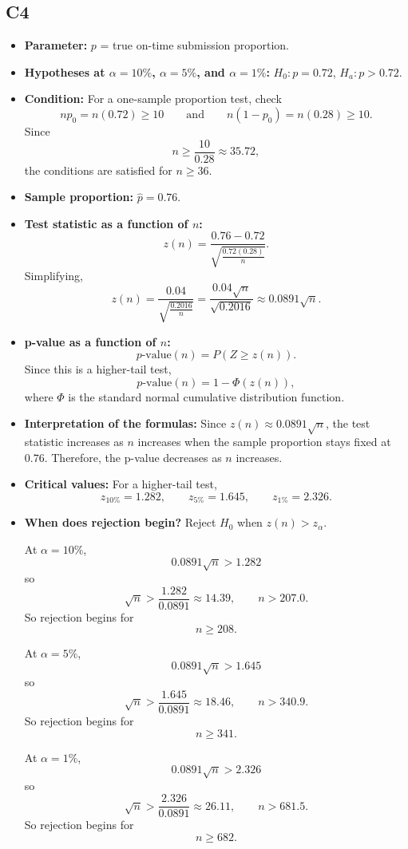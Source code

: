 \subsection*{C4}
\begin{itemize}
	\item \textbf{Parameter:} \(p\) = true on-time submission proportion.
	\item \textbf{Hypotheses at \(\alpha=10\%\), \(\alpha=5\%\), and \(\alpha=1\%\):} \(H_0\colon p=0.72\), \(H_a\colon p>0.72\).
	\item \textbf{Condition:} For a one-sample proportion test, check
	\[
	np_0=n(0.72)\ge10
	\qquad\text{and}\qquad
	n(1-p_0)=n(0.28)\ge10.
	\]
	Since
	\[
	n\ge \frac{10}{0.28}\approx 35.72,
	\]
	the conditions are satisfied for \(n\ge36\).
	\item \textbf{Sample proportion:} \(\hat p=0.76\).
	\item \textbf{Test statistic as a function of \(n\):}
	\[
	z(n)=\frac{0.76-0.72}{\sqrt{\frac{0.72(0.28)}{n}}}.
	\]
	Simplifying,
	\[
	z(n)=\frac{0.04}{\sqrt{\frac{0.2016}{n}}}
	=\frac{0.04\sqrt{n}}{\sqrt{0.2016}}
	\approx 0.0891\sqrt{n}.
	\]
	\item \textbf{p-value as a function of \(n\):}
	\[
	p\text{-value}(n)=P(Z\ge z(n)).
	\]
	Since this is a higher-tail test,
	\[
	p\text{-value}(n)=1-\Phi(z(n)),
	\]
	where \(\Phi\) is the standard normal cumulative distribution function.
	\item \textbf{Interpretation of the formulas:} Since \(z(n)\approx 0.0891\sqrt{n}\), the test statistic increases as \(n\) increases when the sample proportion stays fixed at \(0.76\). Therefore, the p-value decreases as \(n\) increases.
	\item \textbf{Critical values:} For a higher-tail test,
	\[
	z_{10\%}=1.282,\qquad z_{5\%}=1.645,\qquad z_{1\%}=2.326.
	\]
	\item \textbf{When does rejection begin?} Reject \(H_0\) when \(z(n)>z_\alpha\).
	
	At \(\alpha=10\%\),
	\[
	0.0891\sqrt{n}>1.282
	\]
	so
	\[
	\sqrt{n}>\frac{1.282}{0.0891}\approx 14.39,
	\qquad
	n>207.0.
	\]
	So rejection begins for
	\[
	n\ge208.
	\]
	
	At \(\alpha=5\%\),
	\[
	0.0891\sqrt{n}>1.645
	\]
	so
	\[
	\sqrt{n}>\frac{1.645}{0.0891}\approx 18.46,
	\qquad
	n>340.9.
	\]
	So rejection begins for
	\[
	n\ge341.
	\]
	
	At \(\alpha=1\%\),
	\[
	0.0891\sqrt{n}>2.326
	\]
	so
	\[
	\sqrt{n}>\frac{2.326}{0.0891}\approx 26.11,
	\qquad
	n>681.5.
	\]
	So rejection begins for
	\[
	n\ge682.
	\]
	

\end{itemize}
